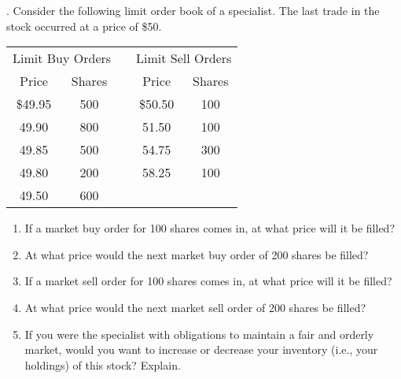 \documentclass[11.5pt]{article}
\begin{document}
. Consider the following limit order book of a specialist. The last trade in the stock occurred at a price of \$50.

\begin{table}[h]
	\begin{tabular}{ccccc}
		\hline
		\multicolumn{2}{c}{Limit Buy Orders} &  & \multicolumn{2}{c}{Limit Sell Orders} \\ \cline{1-2} \cline{4-5} 
		Price             & Shares           &  & Price              & Shares           \\ \cline{1-2} \cline{4-5} 
		\$49.95           & 500              &  & \$50.50            & 100              \\
		49.90             & 800              &  & 51.50              & 100              \\
		49.85             & 500              &  & 54.75              & 300              \\
		49.80             & 200              &  & 58.25              & 100              \\
		49.50             & 600              &  &                    &                  \\ \hline
	\end{tabular}
\end{table}


\begin{enumerate}[a]
	\item If a market buy order for 100 shares comes in, at what price will it be filled?
	
	\item At what price would the next market buy order of 200 shares be filled?
	
	\item If a market sell order for 100 shares comes in, at what price will it be filled?
	
	\item At what price would the next market sell order of 200 shares be filled?
	
	\item If you were the specialist with obligations to maintain a fair and orderly market, would you want to increase or decrease your inventory (i.e., your holdings) of this stock? Explain.
	
\end{enumerate}
\end{document}
